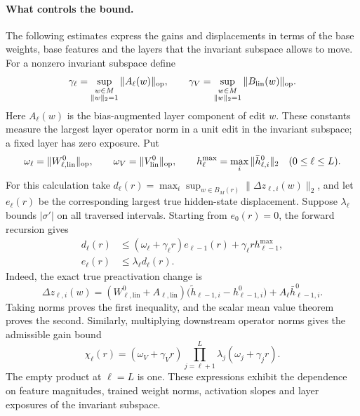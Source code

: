 \documentclass[twoside]{article}
\theoremstyle{remark}
\theoremstyle{highlightdefinition}
\theoremstyle{remark}
\begin{document}
\paragraph{What controls the bound.}
The following estimates express the gains and displacements in terms of the base weights, base features and the layers that the invariant subspace allows to move. For a nonzero invariant subspace define
\[
 \gamma_\ell=\sup_{\substack{w\in M\\\|w\|_2=1}}\|A_\ell(w)\|_{\rm op},\qquad
 \gamma_V=\sup_{\substack{w\in M\\\|w\|_2=1}}\|B_{\mathrm{lin}}(w)\|_{\rm op}.
\]
Here $A_\ell(w)$ is the bias-augmented layer component of edit $w$. These constants measure the largest layer operator norm in a unit edit in the invariant subspace; a fixed layer has zero exposure. Put
\[
 \omega_\ell=\|W_{\ell,\mathrm{lin}}^0\|_{\rm op},\qquad
 \omega_V=\|V_{\mathrm{lin}}^0\|_{\rm op},\qquad
 h_\ell^{\max}=\max_i\|\bar h_{\ell,i}^0\|_2\quad(0\le\ell\le L).
\]
For this calculation take $d_\ell(r)=\max_i\sup_{w\in B_M(r)}\|\Delta z_{\ell,i}(w)\|_2$, and let $e_\ell(r)$ be the corresponding largest true hidden-state displacement. Suppose $\lambda_\ell$ bounds $|\sigma'|$ on all traversed intervals. Starting from $e_0(r)=0$, the forward recursion gives
\begin{align}
 d_\ell(r)&\le(\omega_\ell+\gamma_\ell r)e_{\ell-1}(r)
                  +\gamma_\ell rh_{\ell-1}^{\max},\label{eq:app-radius-forward}\\
 e_\ell(r)&\le\lambda_\ell d_\ell(r).\nonumber
\end{align}
Indeed, the exact true preactivation change is
\[
 \Delta z_{\ell,i}(w)
 =(W_{\ell,\mathrm{lin}}^0+A_{\ell,\mathrm{lin}})\bigl(\widetilde h_{\ell-1,i}-h_{\ell-1,i}^0\bigr)
   +A_\ell\bar h_{\ell-1,i}^0.
\]
Taking norms proves the first inequality, and the scalar mean value theorem proves the second. Similarly, multiplying downstream operator norms gives the admissible gain bound
\begin{equation}
 \chi_\ell(r)=(\omega_V+\gamma_Vr)
          \prod_{j=\ell+1}^L\lambda_j(\omega_j+\gamma_jr).
 \label{eq:app-gain-product}
\end{equation}
The empty product at $\ell=L$ is one. These expressions exhibit the dependence on feature magnitudes, trained weight norms, activation slopes and layer exposures of the invariant subspace.
\end{document}

